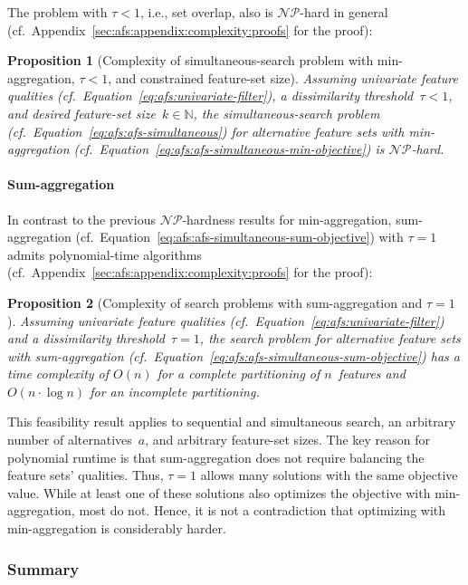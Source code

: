 \documentclass{article}
\newtheorem{proposition}{Proposition}
\theoremstyle{definition}
\begin{document}
The problem with $\tau < 1$, i.e., set overlap, also is $\mathcal{NP}$-hard in general (cf.~Appendix~\ref{sec:afs:appendix:complexity:proofs} for the proof):
%
\begin{proposition}[Complexity of simultaneous-search problem with min-aggregation, $\tau < 1$, and constrained feature-set size]
	Assuming univariate feature qualities (cf.~Equation~\ref{eq:afs:univariate-filter}), a dissimilarity threshold~$\tau < 1$, and desired feature-set size~$k \in \mathbb{N}$, the simultaneous-search problem (cf.~Equation~\ref{eq:afs:afs-simultaneous}) for alternative feature sets with min-aggregation (cf.~Equation~\ref{eq:afs:afs-simultaneous-min-objective}) is $\mathcal{NP}$-hard.
	\label{prop:afs:complexity-no-partitioning-min-constrained-k}
\end{proposition}

\paragraph{Sum-aggregation}

In contrast to the previous $\mathcal{NP}$-hardness results for min-aggregation, sum-aggregation (cf.~Equation~\ref{eq:afs:afs-simultaneous-sum-objective}) with $\tau=1$ admits polynomial-time algorithms (cf.~Appendix~\ref{sec:afs:appendix:complexity:proofs} for the proof):
%
\begin{proposition}[Complexity of search problems with sum-aggregation and $\tau=1$]
	Assuming univariate feature qualities (cf.~Equation~\ref{eq:afs:univariate-filter}) and a dissimilarity threshold~$\tau = 1$, the search problem for alternative feature sets with sum-aggregation (cf.~Equation~\ref{eq:afs:afs-simultaneous-sum-objective}) has a time complexity of $O(n)$ for a complete partitioning of $n$~features and $O(n \cdot \log n)$ for an incomplete partitioning.
	\label{prop:afs:complexity-partitioning-sum}
\end{proposition}
%
This feasibility result applies to sequential and simultaneous search, an arbitrary number of alternatives~$a$, and arbitrary feature-set sizes.
The key reason for polynomial runtime is that sum-aggregation does not require balancing the feature sets' qualities.
Thus, $\tau=1$ allows many solutions with the same objective value.
While at least one of these solutions also optimizes the objective with min-aggregation, most do not.
Hence, it is not a contradiction that optimizing with min-aggregation is considerably harder.

\subsubsection{Summary}
\label{sec:afs:approach:complexity:summary}
\end{document}
